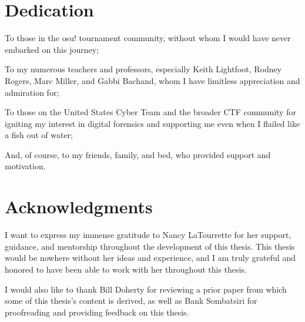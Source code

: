 \documentclass[letterpaper,12pt]{report}
\begin{document}


\section*{Dedication}

To those in the osu! tournament community, without whom I would have
never embarked on this journey;

To my numerous teachers and professors, especially Keith Lightfoot,
Rodney Rogers, Marc Miller, and Gabbi Bachand, whom I have limitless
appreciation and admiration for;

To those on the United States Cyber Team and the broader CTF
community for igniting my interest in digital forensics and supporting
me even when I flailed like a fish out of water;

And, of course, to my friends, family, and bed, who provided support and motivation.


\newpage

\section*{Acknowledgments}

I want to express my immense gratitude to Nancy LaTourrette for her
support, guidance, and mentorship throughout the development of this
thesis. This thesis would be nowhere without her ideas and experience,
and I am truly grateful and honored to have been able to work with her
throughout this thesis.

I would also like to thank Bill Doherty for reviewing a prior paper
from which some of this thesis's content is derived, as well as Bank Sombatsiri
for proofreading and providing feedback on this thesis.


\newpage
\renewcommand*\contentsname{Table of Contents}
\tableofcontents

\newpage
\listoftables

\newpage
\listoffigures

\newpage
\renewcommand{\lstlistlistingname}{List of Code Listings}
\lstlistoflistings
\end{document}
